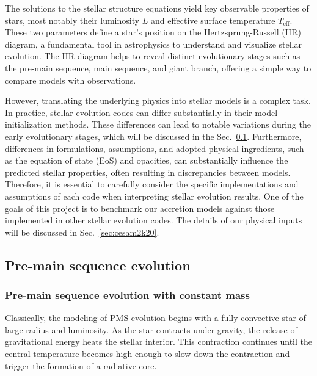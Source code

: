 \documentclass[12pt,a4paper]{article}
\newcommand{\mr}{\mathrm}
\begin{document}
The solutions to the stellar structure equations yield key observable properties of stars, most notably their luminosity $L$ and effective surface temperature $T_\mr{eff}$. These two parameters define a star's position on the Hertzsprung-Russell (HR) diagram, a fundamental tool in astrophysics to understand and visualize stellar evolution. The HR diagram helps to reveal distinct evolutionary stages such as the pre-main sequence, main sequence, and giant branch, offering a simple way to compare models with observations.

However, translating the underlying physics into stellar models is a complex task. In practice, stellar evolution codes can differ substantially in their model initialization methods. These differences can lead to notable variations during the early evolutionary stages, which will be discussed in the Sec.~\ref{sec:pms_evolution}. Furthermore, differences in formulations, assumptions, and adopted physical ingredients, such as the equation of state (EoS) and opacities, can substantially influence the predicted stellar properties, often resulting in discrepancies between models. Therefore, it is essential to carefully consider the specific implementations and assumptions of each code when interpreting stellar evolution results. One of the goals of this project is to benchmark our accretion models against those implemented in other stellar evolution codes. The details of our physical inputs will be discussed in Sec.~\ref{sec:cesam2k20}. 

\subsection{Pre-main sequence evolution}
\label{sec:pms_evolution}

\subsubsection{Pre-main sequence evolution with constant mass}
\label{sec:pms_const_mass}

Classically, the modeling of PMS evolution begins with a fully convective star of large radius and luminosity. As the star contracts under gravity, the release of gravitational energy heats the stellar interior. This contraction continues until the central temperature becomes high enough to slow down the contraction and trigger the formation of a radiative core.
\end{document}
